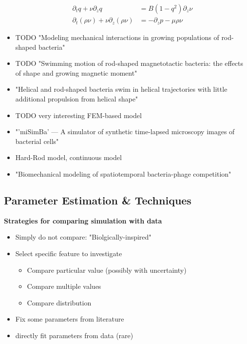 \documentclass{article}
\begin{document}
\begin{itemize}
\begin{align}
        \partial_t q + \nu \partial_z q &= B(1-q^2) \partial_z \nu\\
        \partial_t(\rho \nu) + \nu \partial_z (\rho \nu) &= - \partial_z p - \mu \rho \nu
    \end{align}
    \item \cite{Pleyer2023} TODO "Modeling mechanical interactions in growing populations of
        rod-shaped bacteria"
    \item \cite{Kong2014} TODO "Swimming motion of rod-shaped magnetotactic bacteria: the effects of
        shape and growing magnetic moment"
    \item \cite{Constantino2016} "Helical and rod-shaped bacteria swim in helical trajectories with
        little additional propulsion from helical shape"
    \item \cite{Starru} TODO very interesting FEM-based model
    \item \cite{Martins2015} "'miSimBa' — A simulator of synthetic time-lapsed microscopy images of
        bacterial cells"
    \item \cite{You2018} Hard-Rod model, continuous model
    \item \cite{Valdez2025} "Biomechanical modeling of spatiotemporal bacteria-phage competition"
\end{itemize}

\subsection{Parameter Estimation \& Techniques}

\textbf{Strategies for comparing simulation with data}
\begin{itemize}
    \item Simply do not compare: "Biolgically-inspired"
    \item Select specific feature to investigate
    \begin{itemize}
        \item Compare particular value (possibly with uncertainty)
        \item Compare multiple values
        \item Compare distribution
    \end{itemize}
    \item Fix some parameters from literature
    \item directly fit parameters from data (rare)
\end{itemize}
\end{document}
